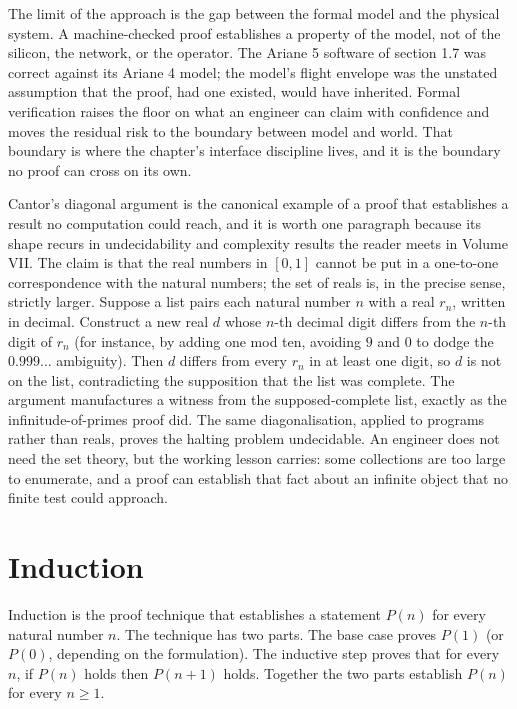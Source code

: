 The limit of the approach is the gap between the formal model and the
physical system. A machine-checked proof establishes a property of the
model, not of the silicon, the network, or the operator. The Ariane 5
software of section 1.7 was correct against its Ariane 4 model; the
model's flight envelope was the unstated assumption that the proof, had
one existed, would have inherited. Formal verification raises the floor
on what an engineer can claim with confidence and moves the residual
risk to the boundary between model and world. That boundary is where
the chapter's interface discipline lives, and it is the boundary no
proof can cross on its own.

\begin{mastery}
Cantor's diagonal argument is the canonical example of a proof that
establishes a result no computation could reach, and it is worth one
paragraph because its shape recurs in undecidability and complexity
results the reader meets in Volume VII. The claim is that the real
numbers in $[0, 1]$ cannot be put in a one-to-one correspondence with
the natural numbers; the set of reals is, in the precise sense,
strictly larger. Suppose a list pairs each natural number $n$ with a
real $r_{n}$, written in decimal. Construct a new real $d$ whose
$n$-th decimal digit differs from the $n$-th digit of $r_{n}$ (for
instance, by adding one mod ten, avoiding $9$ and $0$ to dodge the
$0.999\ldots$ ambiguity). Then $d$ differs from every $r_{n}$ in at
least one digit, so $d$ is not on the list, contradicting the
supposition that the list was complete. The argument manufactures a
witness from the supposed-complete list, exactly as the
infinitude-of-primes proof did. The same diagonalisation, applied to
programs rather than reals, proves the halting problem undecidable. An
engineer does not need the set theory, but the working lesson carries:
some collections are too large to enumerate, and a proof can establish
that fact about an infinite object that no finite test could approach.
\end{mastery}

\section{Induction}

Induction is the proof technique that establishes a statement
$P(n)$ for every natural number $n$. The technique has two parts.
The base case proves $P(1)$ (or $P(0)$, depending on the
formulation). The inductive step proves that for every $n$, if
$P(n)$ holds then $P(n+1)$ holds. Together the two parts establish
$P(n)$ for every $n \geq 1$.


